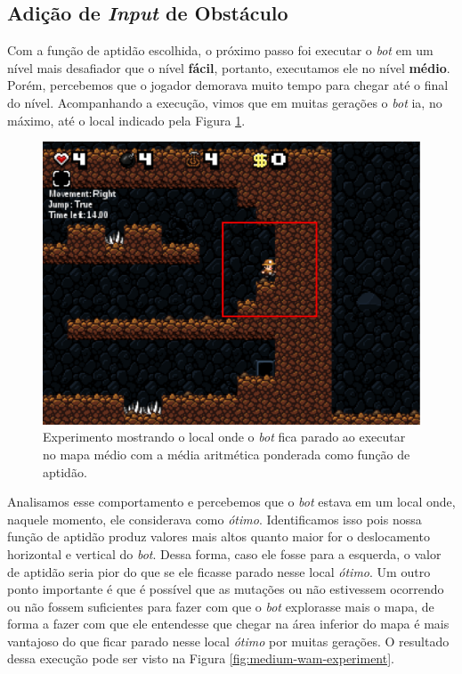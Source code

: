 \subsection{Adição de \textit{Input} de Obstáculo}

Com a função de aptidão escolhida, o próximo passo foi executar o \textit{bot}
em um nível mais desafiador que o nível \textbf{fácil}, portanto, executamos
ele no nível \textbf{médio}. Porém, percebemos que o jogador demorava muito
tempo para chegar até o final do nível. Acompanhando a execução, vimos que em
muitas gerações o \textit{bot} ia, no máximo, até o local indicado pela Figura
\ref{fig:experiment-medium-stuck}.

\begin{figure}[htb!]
\centering
\includegraphics[width=.5\textwidth]{fig/experiment-medium-stuck.pdf}
\caption{Experimento mostrando o local onde o \textit{bot} fica parado ao
    executar no mapa médio com a média aritmética ponderada como função de
    aptidão.}
\label{fig:experiment-medium-stuck}
\end{figure}

Analisamos esse comportamento e percebemos que o \textit{bot} estava em um
local onde, naquele momento, ele considerava como \textit{ótimo}. Identificamos
isso pois nossa função de aptidão produz valores mais altos quanto maior for o
deslocamento horizontal e vertical do \textit{bot}. Dessa forma, caso ele fosse
para a esquerda, o valor de aptidão seria pior do que se ele ficasse parado
nesse local \textit{ótimo}. Um outro ponto importante é que é possível que as
mutações ou não estivessem ocorrendo ou não fossem suficientes para fazer com
que o \textit{bot} explorasse mais o mapa, de forma a fazer com que ele
entendesse que chegar na área inferior do mapa é mais vantajoso do que ficar
parado nesse local \textit{ótimo} por muitas gerações. O resultado dessa
execução pode ser visto na Figura \ref{fig:medium-wam-experiment}.

